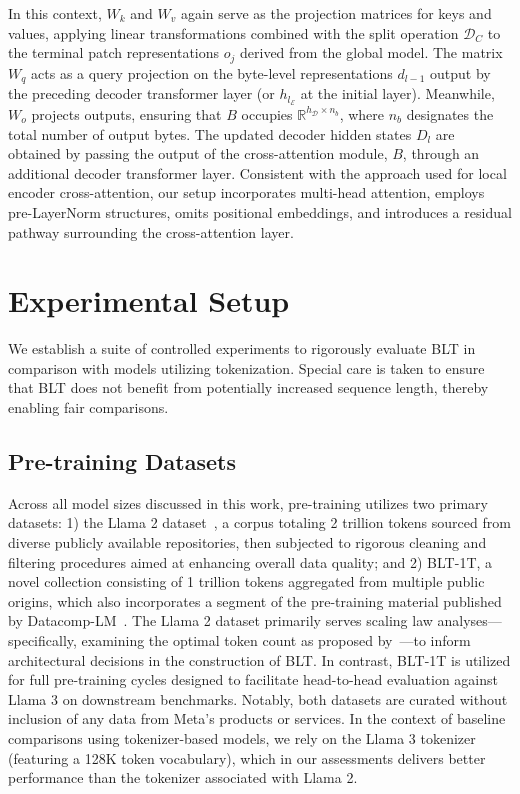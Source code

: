 In this context, $W_k$ and $W_v$ again serve as the projection matrices for keys and values, applying linear transformations combined with the split operation $\mathcal{D}_C$ to the terminal patch representations $o_j$ derived from the global model. The matrix $W_q$ acts as a query projection on the byte-level representations $d_{l-1}$ output by the preceding decoder transformer layer (or $h_{l_{\mathcal{E}}}$ at the initial layer). Meanwhile, $W_o$ projects outputs, ensuring that $B$ occupies $\mathbb{R}^{h_{\mathcal{D}} \times n_b}$, where $n_b$ designates the total number of output bytes. The updated decoder hidden states $D_l$ are obtained by passing the output of the cross-attention module, $B$, through an additional decoder transformer layer. Consistent with the approach used for local encoder cross-attention, our setup incorporates multi-head attention, employs pre-LayerNorm structures, omits positional embeddings, and introduces a residual pathway surrounding the cross-attention layer.

\section{Experimental Setup}
\label{section:experiments}
We establish a suite of controlled experiments to rigorously evaluate {\textsc BLT} in comparison with models utilizing tokenization. Special care is taken to ensure that {\textsc BLT} does not benefit from potentially increased sequence length, thereby enabling fair comparisons.

\subsection{Pre-training Datasets} Across all model sizes discussed in this work, pre-training utilizes two primary datasets: 1) the Llama 2 dataset~\citep{touvron2023llama}, a corpus totaling 2 trillion tokens sourced from diverse publicly available repositories, then subjected to rigorous cleaning and filtering procedures aimed at enhancing overall data quality; and 2) {\textsc BLT}-1T, a novel collection consisting of 1 trillion tokens aggregated from multiple public origins, which also incorporates a segment of the pre-training material published by Datacomp-LM~\citep{li2024datacomp}. The Llama 2 dataset primarily serves scaling law analyses—specifically, examining the optimal token count as proposed by~\cite{dubey2024llama}—to inform architectural decisions in the construction of {\textsc BLT}. In contrast, {\textsc BLT}-1T is utilized for full pre-training cycles designed to facilitate head-to-head evaluation against Llama 3 on downstream benchmarks. Notably, both datasets are curated without inclusion of any data from Meta’s products or services. In the context of baseline comparisons using tokenizer-based models, we rely on the Llama 3 tokenizer (featuring a 128K token vocabulary), which in our assessments delivers better performance than the tokenizer associated with Llama 2.

